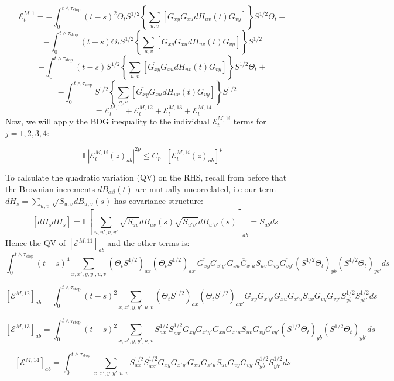 \documentclass[11pt]{article}
\newcommand{\sto}{\text{stop}}
\begin{document}
$$\mathcal{E}_t^{M, 1} = -\int_0^{t\wedge \tau_\sto}(t-s)^2\Theta_tS^{1/2}\left\{\sum_{u, v}\left[\overline{G_{xy}}G_{xu}dH_{uv}(t)G_{vy}\right]\right\}S^{1/2}\Theta_t+$$
$$-\int_0^{t\wedge \tau_\sto}(t-s)\Theta_tS^{1/2}\left\{\sum_{u, v}\left[\overline{G_{xy}}G_{xu}dH_{uv}(t)G_{vy}\right]\right\}S^{1/2}$$
$$-\int_0^{t\wedge \tau_\sto}(t-s)S^{1/2}\left\{\sum_{u, v}\left[\overline{G_{xy}}G_{xu}dH_{uv}(t)G_{vy}\right]\right\}S^{1/2}\Theta_t+$$
$$-\int_0^{t\wedge \tau_\sto}S^{1/2}\left\{\sum_{u, v}\left[\overline{G_{xy}}G_{xu}dH_{uv}(t)G_{vy}\right]\right\}S^{1/2} =$$
$$= \mathcal{E}_t^{M, 11}+\mathcal{E}_t^{M, 12}+\mathcal{E}_t^{M, 13}+\mathcal{E}_t^{M, 14}$$
Now, we will apply the BDG inequality to the individual $\mathcal{E}_t^{M, 1i}$ terms for $j=1, 2, 3, 4$:

$$\mathbb{E}\left\vert \mathcal{E}^{M, 1i}_t(z)_{ab}\right\vert^{2p}\leq C_p\mathbb{E}\left[ \mathcal{E}^{M, 1i}_t(z)_{ab} \right]^p$$


\noindent To calculate the quadratic variation (QV) on the RHS, recall from before that the Brownian increments $dB_{\alpha\beta}(t)$ are mutually uncorrelated, i.e our term $dH_s = \sum_{u, v} \sqrt{S_{u, v}}dB_{u, v}(s)$ has covariance structure: $$\mathbb{E}\left[dH_s\overline{dH_s}\right] = \mathbb{E}\left[\sum_{u, u', v, v'}\sqrt{S_{uv}}dB_{uv}(s)\sqrt{S_{u'v'}}dB_{u'v'}(s)\right]_{ab}=S_{ab}ds$$
Hence the QV of $\left[\mathcal{E}^{M, 11}\right]_{ab}$ and the other terms is:
$$ \int_0^{t\wedge \tau_\sto}(t-s)^4\sum_{x, x', y, y', u, v}(\Theta_tS^{1/2})_{ax}(\Theta_tS^{1/2})_{ax'}\overline{G_{xy}}G_{x'y'}G_{xu}\overline{G}_{x'u}S_{uv}G_{vy}\overline{G_{vy'}}(S^{1/2}\Theta_t)_{yb}(S^{1/2}\Theta_t)_{yb'}ds$$

$$\left[\mathcal{E}^{M, 12}\right]_{ab} = \int_0^{t\wedge \tau_\sto}(t-s)^2\sum_{x, x', y, y', u, v}(\Theta_tS^{1/2})_{ax}(\Theta_tS^{1/2})_{ax'}\overline{G_{xy}}G_{x'y'}G_{xu}\overline{G}_{x'u}S_{uv}G_{vy}\overline{G_{vy'}}S^{1/2}_{yb}S^{1/2}_{yb'}ds$$

$$\left[\mathcal{E}^{M, 13}\right]_{ab} = \int_0^{t\wedge \tau_\sto}(t-s)^2\sum_{x, x', y, y', u, v}S^{1/2}_{ax}S^{1/2}_{ax'}\overline{G_{xy}}G_{x'y'}G_{xu}\overline{G}_{x'u}S_{uv}G_{vy}\overline{G_{vy'}}(S^{1/2}\Theta_t)_{yb}(S^{1/2}\Theta_t)_{yb'}ds$$

$$\left[\mathcal{E}^{M, 14}\right]_{ab} = \int_0^{t\wedge \tau_\sto}\sum_{x, x', y, y', u, v}S^{1/2}_{ax}S^{1/2}_{ax'}\overline{G_{xy}}G_{x'y'}G_{xu}\overline{G}_{x'u}S_{uv}G_{vy}\overline{G_{vy'}}S^{1/2}_{yb}S^{1/2}_{yb'}ds$$
\end{document}
